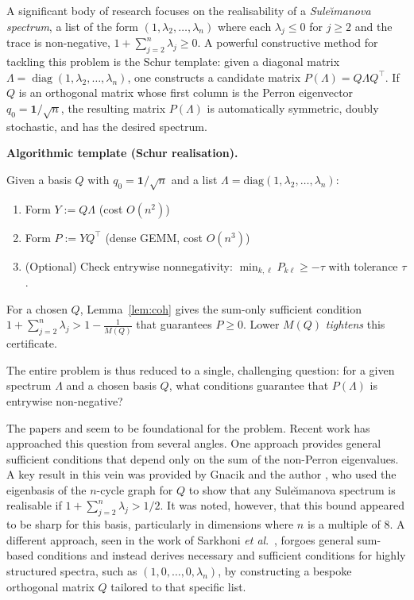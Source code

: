\documentclass[12pt,fleqn]{amsart}
\renewcommand{\le}{\leqslant}
\renewcommand{\ge}{\geqslant}
\theoremstyle{remark}
\newcommand{\1}{\mathbf{1}}
\begin{document}
A significant body of research focuses on the realisability of a \emph{Sule\u{\i}manova spectrum}, a list of the form $(1, \lambda_2, \dots, \lambda_n)$ where each $\lambda_j \le 0$ for $j \ge 2$ and the trace is non-negative, $1 + \sum_{j=2}^n \lambda_j \ge 0$. A powerful constructive method for tackling this problem is the Schur template: given a diagonal matrix $\Lambda = \operatorname{diag}(1, \lambda_2, \dots, \lambda_n)$, one constructs a candidate matrix $P(\Lambda) = Q\Lambda Q^\top$. If $Q$ is an orthogonal matrix whose first column is the Perron eigenvector $q_0 = \mathbf{1}/\sqrt{n}$, the resulting matrix $P(\Lambda)$ is automatically symmetric, doubly stochastic, and has the desired spectrum. 
\medskip

\noindent\textbf{Algorithmic template (Schur realisation).}

Given a basis $Q$ with $q_0=\1/\sqrt n$ and a list $\Lambda=\mathrm{diag}(1,\lambda_2,\ldots,\lambda_n)$:
\begin{enumerate}[leftmargin=*,itemsep=1pt]
\item Form $Y:=Q\Lambda$ \hfill (cost $O(n^2)$)
\item Form $P:=YQ^\top$ \hfill (dense GEMM, cost $O(n^3)$)
\item (Optional) Check entrywise nonnegativity: $\min_{k,\ell}P_{k\ell}\ge -\tau$ with tolerance $\tau$.
\end{enumerate}
For a chosen $Q$, Lemma~\ref{lem:coh} gives the sum-only sufficient condition $1+\sum_{j=2}^n\lambda_j>1-\tfrac{1}{M(Q)}$ that guarantees $P\ge0$. Lower $M(Q)$ \emph{tightens} this certificate.
\medskip

The entire problem is thus reduced to a single, challenging question: for a given spectrum $\Lambda$ and a chosen basis $Q$, what conditions guarantee that $P(\Lambda)$ is entrywise non-negative?\smallskip

The papers \cite{Perfect} and \cite{PM65} seem to be foundational for the problem. Recent work has approached this question from several angles. One approach provides general sufficient conditions that depend only on the sum of the non-Perron eigenvalues. A key result in this vein was provided by Gnacik and the author \cite{GK20}, who used the eigenbasis of the $n$-cycle graph for $Q$ to show that any Sule\u{\i}manova spectrum is realisable if $1 + \sum_{j=2}^n \lambda_j > 1/2$. It was noted, however, that this bound appeared to be sharp for this basis, particularly in dimensions where $n$ is a multiple of 8. A different approach, seen in the work of Sarkhoni \emph{et al}.~\cite{Sarkhoni25}, forgoes general sum-based conditions and instead derives necessary and sufficient conditions for highly structured spectra, such as $(1, 0, \dots, 0, \lambda_n)$, by constructing a bespoke orthogonal matrix $Q$ tailored to that specific list.\smallskip
\end{document}
